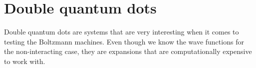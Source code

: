 \iffalse
\section{Double quantum dots}
Double quantum dots are systems that are very interesting when it comes to testing the Boltzmann machines. Even though we know the wave functions for the non-interacting case, they are expansions that are computationally expensive to work with.


